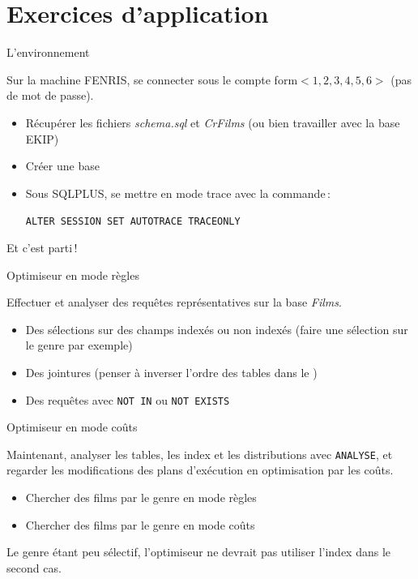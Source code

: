 \section{Exercices d'application}
\begin{frame}{L'environnement}{

Sur la machine FENRIS, se connecter sous 
le compte form$<1, 2, 3, 4, 5, 6>$ (pas de mot de passe).

\begin{itemize}
   \item Récupérer les fichiers \textit{schema.sql}
                   et \textit{CrFilms} (ou bien travailler
                   avec la base EKIP)

   \item Créer une base

   \item Sous SQLPLUS, se mettre en mode trace avec la commande\,:

\texttt{ALTER SESSION SET AUTOTRACE TRACEONLY}

\end{itemize}

Et c'est parti\,!
}\end{frame}
\begin{frame}{Optimiseur en mode règles}{

Effectuer et analyser des requêtes représentatives
 sur la base \textit{Films}.

\begin{itemize}
  \item Des sélections sur des champs indexés
        ou non indexés (faire une sélection sur le genre par exemple)

  \item Des jointures (penser à inverser l'ordre des tables
          dans le )

  \item Des requêtes avec \texttt{NOT IN} ou \texttt{NOT EXISTS}
\end{itemize}

}\end{frame}
\begin{frame}{Optimiseur en mode coûts}{

Maintenant, analyser les tables, les index et les distributions
      avec \texttt{ANALYSE}, et regarder les modifications
des plans d'exécution en optimisation par les coûts.
\begin{itemize}
  \item Chercher des films par le genre en mode règles
  \item Chercher des films par le genre en mode coûts
\end{itemize}
Le genre étant peu sélectif, l'optimiseur ne devrait pas
utiliser l'index dans le second cas.

}\end{frame}
